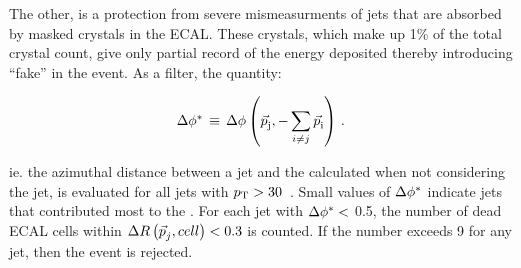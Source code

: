 The other, is a protection from severe mismeasurments of jets that are absorbed
by masked crystals in the ECAL. These crystals, which make up 1\% of the 
total crystal count, give only partial record of the energy deposited thereby introducing
``fake'' \mht in the event. As a filter, the quantity:

\begin{equation}
  \label{eq:dphistart}
  \mbox{$\Delta\phi^{*}$}\, \equiv \,\Delta\phi \left(\mbox{$\vec{p}$}_{\rm j}, -\sum_{i\neq j} \mbox{$\vec{p}$}_{{\rm i}}\right)\, .
\end{equation}

ie. the azimuthal distance between a jet and the \mht calculated when not considering the jet,
is evaluated for all jets with ${p_{\text T}}>30$~\gev.  Small values of $\mbox{$\Delta\phi^{*}$}$ indicate jets 
that contributed most to the \mht.  For each jet with $\mbox{$\Delta\phi^{*}$} <$ 0.5, the number of dead
ECAL cells within $\Delta R \left(\mbox{$\vec{p}$}_{j},cell\right) < 0.3$ is counted. If the number exceeds 
9 for any jet, then the event is rejected. 

